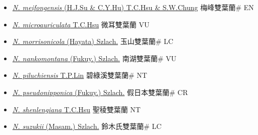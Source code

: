 \begin{itemize}
\begin{itemize}
        \item[] \href{http://www.theplantlist.org/tpl1.1/search?q=Neottia+meifongensis}{\textit{N. meifongensis} (H.J.Su \& C.Y.Hu) T.C.Hsu \& S.W.Chung}     梅峰雙葉蘭\# EN
        \item[] \href{http://www.theplantlist.org/tpl1.1/search?q=Neottia+microauriculata}{\textit{N. microauriculata} T.C.Hsu}   微耳雙葉蘭 VU
        \item[] \href{http://www.theplantlist.org/tpl1.1/search?q=Neottia+morrisonicola}{\textit{N. morrisonicola} (Hayata) Szlach.}     玉山雙葉蘭\# LC
        \item[] \href{http://www.theplantlist.org/tpl1.1/search?q=Neottia+nankomontana}{\textit{N. nankomontana} (Fukuy.) Szlach.}     南湖雙葉蘭\# VU
        \item[] \href{http://www.theplantlist.org/tpl1.1/search?q=Neottia+piluchiensis}{\textit{N. piluchiensis} T.P.Lin}   碧綠溪雙葉蘭\# NT
        \item[] \href{http://www.theplantlist.org/tpl1.1/search?q=Neottia+pseudonipponica}{\textit{N. pseudonipponica} (Fukuy.) Szlach.}     假日本雙葉蘭\# CR
        \item[] \href{http://www.theplantlist.org/tpl1.1/search?q=Neottia+shenlengiana}{\textit{N. shenlengiana} T.C.Hsu}   聖稜雙葉蘭 NT
        \item[] \href{http://www.theplantlist.org/tpl1.1/search?q=Neottia+suzukii}{\textit{N. suzukii} (Masam.) Szlach.}     鈴木氏雙葉蘭\# LC

\end{itemize}
\end{itemize}
